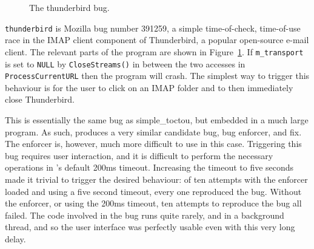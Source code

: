 \begin{figure}
  \caption{The thunderbird bug.}
  \label{fig:eval:thunderbird}
\end{figure}

\verb|thunderbird| is Mozilla bug number
391259\cite{thunderbird39125}, a simple time-of-check, time-of-use
race in the IMAP client component of Thunderbird, a popular
open-source e-mail client.  The relevant parts of the program are
shown in Figure~\ref{fig:eval:thunderbird}.  If \verb|m_transport| is
set to \verb|NULL| by \verb|CloseStreams()| in between the two
accesses in \verb|ProcessCurrentURL| then the program will crash.  The
simplest way to trigger this behaviour is for the user to click on an
IMAP folder and to then immediately close Thunderbird.

This is essentially the same bug as simple\_toctou, but embedded in a
much large program.  As such, {\implementation} produces a very
similar candidate bug, bug enforcer, and fix.  The enforcer is,
however, much more difficult to use in this case.  Triggering this bug
requires user interaction, and it is difficult to perform the
necessary operations in {\implementation}'s default 200ms timeout.
Increasing the timeout to five seconds made it trivial to trigger the
desired behaviour: of ten attempts with the enforcer loaded and using
a five second timeout, every one reproduced the bug.  Without the
enforcer, or using the 200ms timeout, ten attempts to reproduce the
bug all failed.  The code involved in the bug runs quite rarely, and
in a background thread, and so the user interface was perfectly usable
even with this very long delay.


